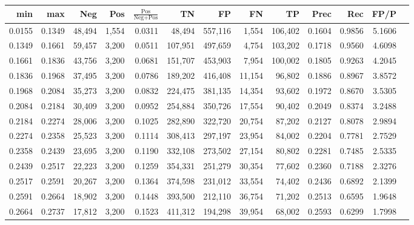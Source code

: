 \begin{tabular}{rrrrrrrrrrrrr}
\toprule
   min &    max &    Neg &   Pos & $\frac{\text{Pos}}{\text{Neg}+\text{Pos}}$ &      TN &      FP &      FN &      TP &   Prec &    Rec &   FP/P \\
\midrule
0.0155 & 0.1349 & 48,494 & 1,554 &                                     0.0311 &  48,494 & 557,116 &   1,554 & 106,402 & 0.1604 & 0.9856 & 5.1606 \\
0.1349 & 0.1661 & 59,457 & 3,200 &                                     0.0511 & 107,951 & 497,659 &   4,754 & 103,202 & 0.1718 & 0.9560 & 4.6098 \\
0.1661 & 0.1836 & 43,756 & 3,200 &                                     0.0681 & 151,707 & 453,903 &   7,954 & 100,002 & 0.1805 & 0.9263 & 4.2045 \\
0.1836 & 0.1968 & 37,495 & 3,200 &                                     0.0786 & 189,202 & 416,408 &  11,154 &  96,802 & 0.1886 & 0.8967 & 3.8572 \\
0.1968 & 0.2084 & 35,273 & 3,200 &                                     0.0832 & 224,475 & 381,135 &  14,354 &  93,602 & 0.1972 & 0.8670 & 3.5305 \\
0.2084 & 0.2184 & 30,409 & 3,200 &                                     0.0952 & 254,884 & 350,726 &  17,554 &  90,402 & 0.2049 & 0.8374 & 3.2488 \\
0.2184 & 0.2274 & 28,006 & 3,200 &                                     0.1025 & 282,890 & 322,720 &  20,754 &  87,202 & 0.2127 & 0.8078 & 2.9894 \\
0.2274 & 0.2358 & 25,523 & 3,200 &                                     0.1114 & 308,413 & 297,197 &  23,954 &  84,002 & 0.2204 & 0.7781 & 2.7529 \\
0.2358 & 0.2439 & 23,695 & 3,200 &                                     0.1190 & 332,108 & 273,502 &  27,154 &  80,802 & 0.2281 & 0.7485 & 2.5335 \\
0.2439 & 0.2517 & 22,223 & 3,200 &                                     0.1259 & 354,331 & 251,279 &  30,354 &  77,602 & 0.2360 & 0.7188 & 2.3276 \\
0.2517 & 0.2591 & 20,267 & 3,200 &                                     0.1364 & 374,598 & 231,012 &  33,554 &  74,402 & 0.2436 & 0.6892 & 2.1399 \\
0.2591 & 0.2664 & 18,902 & 3,200 &                                     0.1448 & 393,500 & 212,110 &  36,754 &  71,202 & 0.2513 & 0.6595 & 1.9648 \\
0.2664 & 0.2737 & 17,812 & 3,200 &                                     0.1523 & 411,312 & 194,298 &  39,954 &  68,002 & 0.2593 & 0.6299 & 1.7998 \\

\end{tabular}
